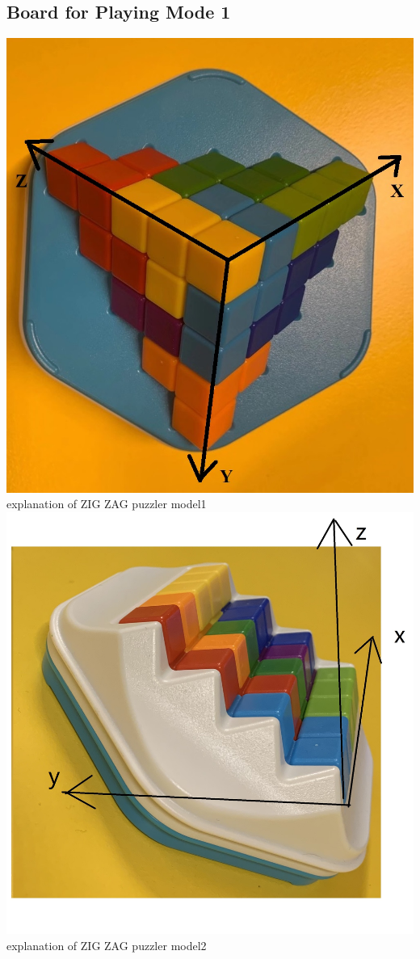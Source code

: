 \subsection{Board for Playing Mode 1}
\label{sec:playing mode 1}
\begin{center}
\includegraphics[scale=0.5]{figs/ZIGZAGmodel1board.jpg} \\
explanation of ZIG ZAG puzzler model1\\
\includegraphics[scale=0.2]{figs/ZIGZAGmodel2board.jpg} \\
explanation of ZIG ZAG puzzler model2
\end{center}
